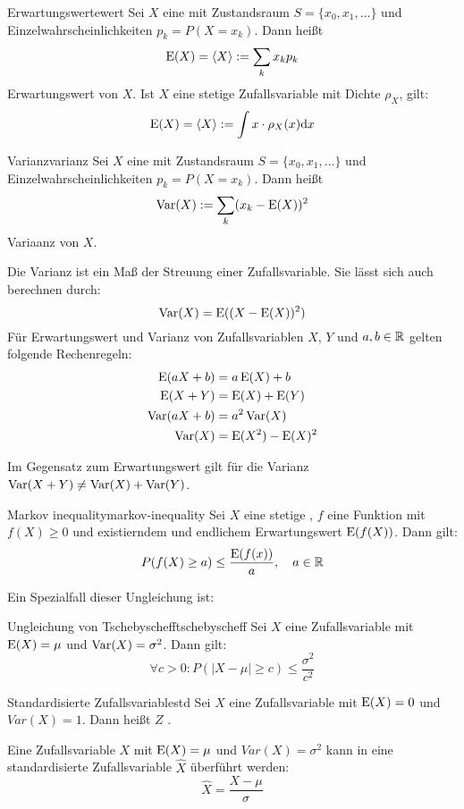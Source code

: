\begin{definition}{Erwartungswert}{ewert}
Sei $X$ eine  mit Zustandsraum $S=\{x_0, x_1,
...\}$ und Einzelwahrscheinlichkeiten $p_k=P(X=x_k)$. Dann heißt
\[
\operatorname{E}(X) =\langle X\rangle := \sum_k x_kp_k
\]
Erwartungswert von $X$. Ist $X$ eine stetige Zufallsvariable mit Dichte
$\rho_X$, gilt:
\[
\operatorname{E}(X) =\langle X\rangle := \int x\cdot\rho_X(x)\mathrm{d}x
\]
\end{definition}

\begin{definition}{Varianz}{varianz}
Sei $X$ eine  mit Zustandsraum $S=\{x_0, x_1,
...\}$ und Einzelwahrscheinlichkeiten $p_k=P(X=x_k)$. Dann heißt
\[
\operatorname{Var}(X) := \sum_k (x_k - \operatorname{E}(X))^2
\]
Variaanz von $X$.
\end{definition}

Die Varianz ist ein Maß der Streuung einer Zufallsvariable. Sie lässt sich auch
berechnen durch:
\[
\operatorname{Var}(X) = \operatorname{E}((X-\operatorname{E}(X))^2)
\]
Für Erwartungswert und Varianz von Zufallsvariablen $X$, $Y$ und $a,b\in\mathbb{R}$ gelten
folgende Rechenregeln:
\begin{align*}
\operatorname{E}(aX+b) &= a\operatorname{E}(X) + b \\
\operatorname{E}(X+Y) &= \operatorname{E}(X) + \operatorname{E}(Y) \\
\operatorname{Var}(aX+b) &= a^2 \operatorname{Var}(X) \\
\operatorname{Var}(X) &= \operatorname{E}(X^2) - \operatorname{E}(X)^2
\end{align*}

Im Gegensatz zum Erwartungswert gilt für die Varianz $\operatorname{Var}(X+Y) \ne \operatorname{Var}(X) +
\operatorname{Var}(Y)$.

\begin{theorem}{Markov inequality}{markov-inequality}
Sei $X$ eine stetige , $f$ eine Funktion mit
$f(X)\ge 0$ und existierndem und endlichem Erwartungswert $\operatorname{E}(f(X))$. Dann gilt:
\[
P(f(X)\ge a)\le \frac{\operatorname{E}(f(x))}{a},\quad a\in\mathbb{R}
\]
\end{theorem}
Ein Spezialfall dieser Ungleichung ist:
\begin{theorem}{Ungleichung von Tschebyscheff}{tschebyscheff}
Sei $X$ eine Zufallsvariable mit $\operatorname{E}(X) = \mu$ und $\operatorname{Var}(X) = \sigma^2$. Dann
gilt:
\[
\forall c>0: P(|X-\mu|\ge c) \le\frac{\sigma^2}{c^2}
\]
\end{theorem}

\begin{definition}{Standardisierte Zufallsvariable}{std}
Sei $X$ eine Zufallsvariable mit $\operatorname{E}(X) = 0$ und $Var(X) = 1$. Dann heißt $Z$
.
\end{definition}

Eine Zufallsvariable $X$ mit $\operatorname{E}(X) = \mu$ und $Var(X)=\sigma^2$ kann in eine
standardisierte Zufallsvariable $\hat{X}$ überführt werden:
\[
\hat{X} = \frac{X-\mu}{\sigma}
\]
